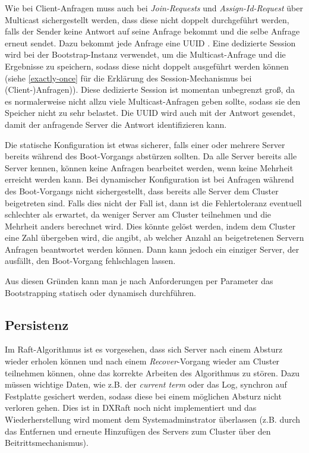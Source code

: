 Wie bei Client-Anfragen muss auch bei \textit{Join-Requests} und \textit{Assign-Id-Request} über Multicast sichergestellt werden, dass diese nicht doppelt durchgeführt werden, falls der Sender keine Antwort auf seine Anfrage bekommt und die selbe Anfrage erneut sendet. Dazu bekommt jede Anfrage eine UUID \cite{uuid}. Eine dedizierte Session wird bei der Bootstrap-Instanz verwendet, um die Multicast-Anfrage und die Ergebnisse zu speichern, sodass diese nicht doppelt ausgeführt werden können (siehe \ref{exactly-once} für die Erklärung des Session-Mechanismus bei (Client-)Anfragen)). Diese dedizierte Session ist momentan unbegrenzt groß, da es normalerweise nicht allzu viele Multicast-Anfragen geben sollte, sodass sie den Speicher nicht zu sehr belastet. Die UUID wird auch mit der Antwort gesendet, damit der anfragende Server die Antwort identifizieren kann.

Die statische Konfiguration ist etwas sicherer, falls einer oder mehrere  Server bereits während des Boot-Vorgangs abstürzen sollten. Da alle Server bereits alle Server kennen, können keine Anfragen bearbeitet werden, wenn keine Mehrheit erreicht werden kann. Bei dynamischer Konfiguration ist bei Anfragen während des Boot-Vorgangs nicht sichergestellt, dass bereits alle Server dem Cluster beigetreten sind. Falls dies nicht der Fall ist, dann ist die Fehlertoleranz eventuell schlechter als erwartet, da weniger Server am Cluster teilnehmen und die Mehrheit anders berechnet wird. Dies könnte gelöst werden, indem dem Cluster eine Zahl übergeben wird, die angibt, ab welcher Anzahl an beigetretenen Servern Anfragen beantwortet werden können. Dann kann jedoch ein einziger Server, der ausfällt, den Boot-Vorgang fehlschlagen lassen.

Aus diesen Gründen kann man je nach Anforderungen per Parameter das Bootstrapping statisch oder dynamisch durchführen.

\subsection{Persistenz}

Im Raft-Algorithmus ist es vorgesehen, dass sich Server nach einem Absturz wieder erholen können und nach einem \textit{Recover}-Vorgang wieder am Cluster teilnehmen können, ohne das korrekte Arbeiten des Algorithmus zu stören. Dazu müssen wichtige Daten, wie z.B. der \textit{current term} oder das Log, synchron auf Festplatte gesichert werden, sodass diese bei einem möglichen Absturz nicht verloren gehen. Dies ist in DXRaft noch nicht implementiert und das Wiederherstellung wird moment dem Systemadminstrator überlassen (z.B. durch das Entfernen und erneute Hinzufügen des Servers zum Cluster über den Beitrittsmechanismus).

